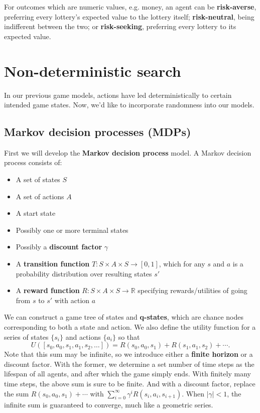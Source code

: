 \documentclass[12pt]{article}
\begin{document}
For outcomes which are numeric values, e.g. money, an agent can be \textbf{risk-averse}, preferring every lottery's expected value to the lottery itself; \textbf{risk-neutral}, being indifferent between the two; or \textbf{risk-seeking}, preferring every lottery to its expected value.

\section{Non-deterministic search}

In our previous game models, actions have led deterministically to certain intended game states. Now, we'd like to incorporate randomness into our models.

\subsection{Markov decision processes (MDPs)}

First we will develop the \textbf{Markov decision process} model. A Markov decision process consists of:
\begin{itemize}
\item A set of states $S$
\item A set of actions $A$
\item A start state
\item Possibly one or more terminal states
\item Possibly a \textbf{discount factor} $\gamma$
\item A \textbf{transition function} $T : S \times A \times S \to [0, 1]$, which for any $s$ and $a$ is a probability distribution over resulting states $s'$
\item A \textbf{reward function} $R : S \times A \times S \to \mathbb R$ specifying rewards/utilities of going from $s$ to $s'$ with action $a$
\end{itemize}
We can construct a game tree of states and \textbf{q-states}, which are chance nodes corresponding to both a state and action. We also define the utility function for a series of states $\{s_i\}$ and actions $\{a_i\}$ so that
\[ U(\left[s_0, a_0, s_1, a_1, s_2, \ldots\right]) = R(s_0, a_0, s_1) + R(s_1, a_1, s_2) + \cdots. \]
Note that this sum may be infinite, so we introduce either a \textbf{finite horizon} or a discount factor. With the former, we determine a set number of time steps as the lifespan of all agents, and after which the game simply ends. With finitely many time steps, the above sum is sure to be finite. And with a discount factor, replace the sum $R(s_0, a_0, s_1) + \cdots$ with $\sum_{i = 0}^\infty \gamma^i R(s_i, a_i, s_{i + 1})$. When $|\gamma| < 1$, the infinite sum is guaranteed to converge, much like a geometric series.
\end{document}

